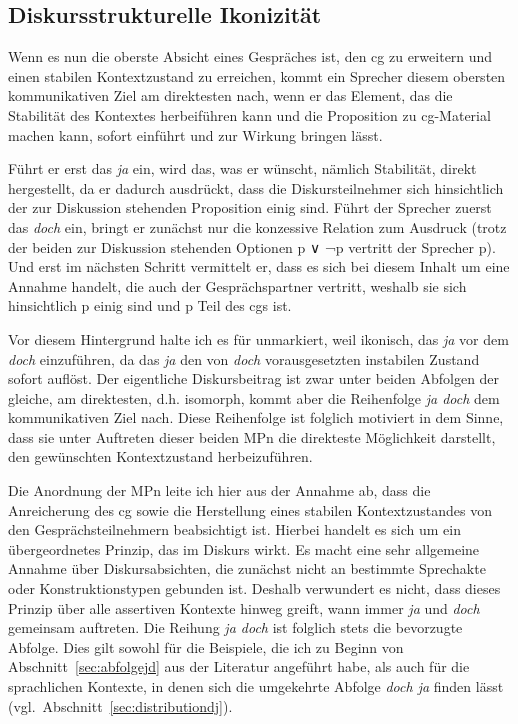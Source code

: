 \subsection{Diskursstrukturelle Ikonizität}
Wenn es nun die oberste Absicht eines Gespräches ist, den cg zu erweitern und einen stabilen Kontextzustand zu erreichen, kommt ein Sprecher diesem obersten kommunikativen Ziel am direktesten nach, wenn er das Element, das die Stabilität des Kontextes herbeiführen kann und die Proposition zu cg-Material machen kann, sofort einführt und zur Wirkung bringen lässt.

Führt er erst das \textit{ja} ein, wird das, was er wünscht, nämlich Stabilität, direkt hergestellt, da er dadurch ausdrückt, dass die Diskursteilnehmer sich hinsichtlich der zur Diskussion stehenden Proposition einig sind. Führt der Sprecher zuerst das \textit{doch} ein, bringt er zunächst nur die konzessive Relation zum Ausdruck (trotz der beiden zur Diskussion stehenden Optionen p ∨ ¬p vertritt der Sprecher p). Und erst im nächsten Schritt vermittelt er, dass es sich bei diesem Inhalt um eine Annahme handelt, die auch der Gesprächspartner vertritt, weshalb sie sich hinsichtlich p einig sind und p Teil des cgs ist. 

Vor diesem Hintergrund halte ich es für unmarkiert, weil ikonisch, das \textit{ja} vor dem \textit{doch} einzuführen, da das \textit{ja} den von \textit{doch} vorausgesetzten instabilen Zustand sofort auflöst. Der eigentliche Diskursbeitrag ist zwar unter beiden Abfolgen der gleiche, am direktesten, d.h.  isomorph, kommt aber die Reihenfolge \textit{ja doch} dem kommunikativen Ziel nach. Diese Reihenfolge ist folglich motiviert in dem Sinne, dass sie unter Auftreten dieser beiden MPn die direkteste Möglichkeit darstellt, den gewünschten Kontextzustand herbeizuführen.

Die Anordnung der MPn leite ich hier aus der Annahme ab, dass die Anrei\-cherung des cg sowie die Herstellung eines stabilen Kontextzustandes von den Gesprächsteilnehmern beabsichtigt ist. Hierbei handelt es sich um ein übergeordnetes Prinzip, das im Diskurs wirkt. Es macht eine sehr allgemeine Annahme über Diskursabsichten, die zunächst nicht an bestimmte Sprechakte oder Konstruktionstypen gebunden ist. Deshalb verwundert es nicht, dass dieses Prinzip über alle assertiven Kontexte hinweg greift, wann immer \textit{ja} und \textit{doch} gemeinsam auftreten. Die Reihung \textit{ja doch} ist folglich stets die bevorzugte Abfolge. Dies gilt sowohl für die Beispiele, die ich zu Beginn von Abschnitt~\ref{sec:abfolgejd} aus der Literatur angeführt habe, als auch für die sprachlichen Kontexte, in denen sich die umgekehrte Abfolge \textit{doch ja} finden lässt (vgl.\ Abschnitt~\ref{sec:distributiondj}).

